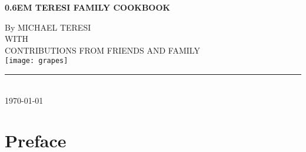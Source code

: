 \documentclass{family_cookbook}
\begin{document}
\frontmatter
{}
\begin{titlepage}


\onecolumn
\pagestyle{empty}
\newcommand\nbvspace[1][3]{\vspace*{\stretch{#1}}}
\newcommand\nbstretchyspace{\spaceskip0.5em plus 0.25em minus 0.25em}
\newcommand{\nbtitlestretch}{\spaceskip0.6em}

{%
	\centering
	\bfseries
	\uppercase{%
		\nbtitlestretch%
		\Huge{teresi family cookbook}
	}
	\nbvspace[1]

	\Large{By MICHAEL TERESI}\\
	\nbvspace[1]
	\small{WITH}\\
	\vspace{1ex}
	\small{CONTRIBUTIONS FROM FRIENDS AND FAMILY}\\
	\nbvspace[1]
	\texttt{[image: grapes]}
	\vfill

	\noindent\rule{0.8\textwidth}{0.5pt}\\
	\smallskip
	\today


}
\end{titlepage}
\restoregeometry

\dominitoc%
\nomtcrule%


\tableofcontents


\chapter*{Preface}


\clearpage


\mainmatter%


\setcounter{mtc}{0}  %
\mtcaddchapter%
\end{document}
